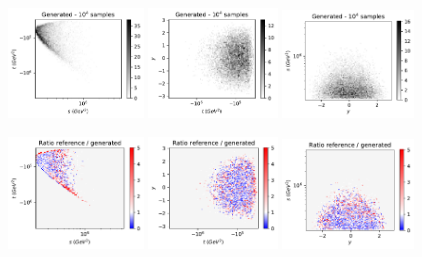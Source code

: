 \documentclass[twocolumn,preprintnumbers,superscriptaddress]{revtex4-2}
\begin{document}
\begin{figure}

  \includegraphics[width=0.32\textwidth]{plots/hardware/ibm_santiago/s-t_FAKE_IBM_10k.pdf}%
  \includegraphics[width=0.305\textwidth]{plots/hardware/ibm_santiago/t-y_FAKE_IBM_10k.pdf}%
  \includegraphics[width=0.31\textwidth]{plots/hardware/ibm_santiago/y-s_FAKE_IBM_10k.pdf}

  \includegraphics[width=0.32\textwidth]{plots/hardware/ibm_santiago/s-t_RATIO_IBM_10k.pdf}%
  \includegraphics[width=0.305\textwidth]{plots/hardware/ibm_santiago/t-y_RATIO_IBM_10k.pdf}%
  \includegraphics[width=0.31\textwidth]{plots/hardware/ibm_santiago/y-s_RATIO_IBM_10k.pdf}


\end{figure}
\end{document}
